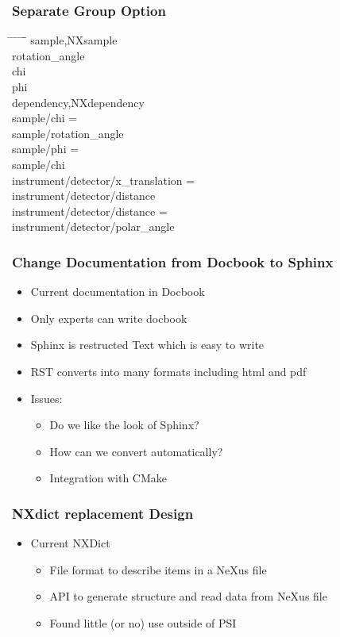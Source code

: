 \documentclass{beamer}
\begin{document}
\begin{frame} \frametitle{Separate Group Option}
\begin{tabbing}
\hspace*{1cm} \= \hspace*{1cm} \= \hspace*{1cm} \= \hspace*{1cm} \= \hspace*{1cm} \= \hspace*{1cm}\= \kill
\>sample,NXsample\\
\> \>rotation\_angle\\
\> \>chi \\
\> \>phi \\
\>dependency,NXdependency\\
\> \>sample/chi = \\
\> \> \>sample/rotation\_angle\\
\> \>sample/phi =\\
\> \> \> sample/chi\\
\> \>instrument/detector/x\_translation = \\
\> \> \>instrument/detector/distance\\
\> \>instrument/detector/distance = \\
\> \> \>instrument/detector/polar\_angle\\
\end{tabbing}
\end{frame}


\begin{frame} \frametitle{Change Documentation from Docbook to Sphinx}
\begin{itemize}
\item Current documentation in Docbook
\item Only experts can write docbook
\item Sphinx is restructed Text which is easy to write
\item RST converts into many formats including html and pdf
\item Issues:
\begin{itemize}
\item Do we like the look of Sphinx?
\item How can we convert automatically?
\item Integration with CMake
\end{itemize}
\end{itemize}
\end{frame}

\begin{frame} \frametitle{NXdict replacement Design}
\begin{itemize}
\item Current NXDict
\begin{itemize}
\item File format to describe items in a NeXus file
\item API to generate structure and read data from NeXus file
\item Found little (or no) use outside of PSI
\end{itemize}
\end{itemize}
\end{frame}
\end{document}
